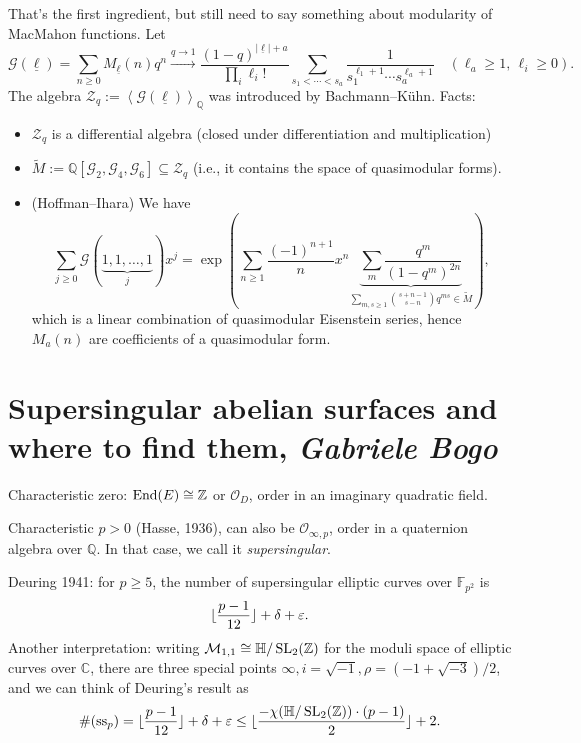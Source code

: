 \documentclass[reqno]{amsart} 
\begin{document}
That's the first ingredient, but still need to say something about modularity of MacMahon functions.  Let
\begin{equation*}
  \mathcal{G}(\underline{\ell}) = \sum_{n \geq 0} M_{\underline{\ell}}(n) q^n \xrightarrow{q \rightarrow 1}
  \frac{(1 - q)^{\lvert \underline{\ell}  \rvert + a}}{\prod_i \ell_i !}
  \sum_{s_1 < \dotsb < s_a}
  \frac{1}{ s_1^{\ell_1 + 1} \dotsb s_a^{\ell_a + 1}}
  \quad
  (\ell_a \geq 1, \, \ell_i \geq 0).
\end{equation*}
The algebra $\mathcal{Z}_q := \left\langle \mathcal{G}(\underline{\ell}) \right\rangle_{\mathbb{Q}}$ was introduced by Bachmann--K{\"u}hn.  Facts:
\begin{itemize}
\item $\mathcal{Z}_q$ is a differential algebra (closed under differentiation and multiplication)
\item $\tilde{M} := \mathbb{Q}[\mathcal{G}_2 , \mathcal{G}_4, \mathcal{G}_6] \subseteq \mathcal{Z}_q$ (i.e., it contains the space of quasimodular forms).
\item (Hoffman--Ihara) We have
  \begin{equation*}
    \sum_{j \geq 0} \mathcal{G}(\underbrace{1, 1, \dotsc, 1}_{j}) x^j = \exp
    \left(
      \sum_{n \geq1}
      \frac{(- 1)^{n + 1}}{ n}
      x^n \underbrace
      {
        \sum_m \frac{q^m}{(1 - q^m)^{2n}}
      }_{
        \sum_{m, s \geq 1} \binom{s + n - 1}{ s - n} q^{m s} \in \tilde{M}
      }
    \right),
  \end{equation*}
  which is a linear combination of quasimodular Eisenstein series, hence $M_a(n)$ are coefficients of a quasimodular form.
\end{itemize}

\section{Supersingular abelian surfaces and where to find them, \textnormal{\emph{Gabriele Bogo}}}
Characteristic zero: $\operatorname{End}(E) \cong \mathbb{Z}$ or $\mathcal{O}_D$, order in an imaginary quadratic field.

Characteristic $p > 0$ (Hasse, 1936), can also be $\mathcal{O}_{\infty, p}$, order in a quaternion algebra over $\mathbb{Q}$.  In that case, we call it \emph{supersingular}.

Deuring 1941: for $p \geq 5$, the number of supersingular elliptic curves over $\mathbb{F}_{p^2}$ is
\begin{equation*}
  \lfloor \frac{p - 1}{12} \rfloor + \delta + \varepsilon.
\end{equation*}
Another interpretation: writing $\mathcal{M}_{1, 1} \cong \mathbb{H} / \operatorname{SL}_2(\mathbb{Z})$ for the moduli space of elliptic curves over $\mathbb{C}$, there are three special points $\infty, i = \sqrt{- 1}, \rho =(- 1 + \sqrt{- 3}) / 2$, and we can think of Deuring's result as
\begin{equation*}
  \#(\mathrm{ss}_p)
  = \lfloor \frac{p - 1}{12} \rfloor + \delta + \varepsilon
  \leq
  \lfloor
  \frac{- \chi(\mathbb{H} / \operatorname{SL}_2(\mathbb{Z})) \cdot(p - 1)}{2}\rfloor + 2.
\end{equation*}
\end{document}
